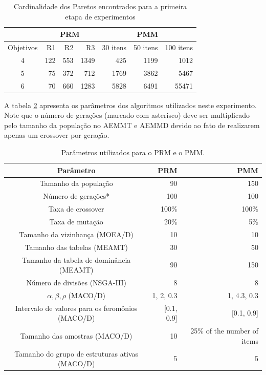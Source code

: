 \begin{table}[!htbp]
	\centering
	\caption{Cardinalidade dos Paretos encontrados para a primeira etapa de experimentos}
	\label{table_exp2_paretos}
	\begin{tabular}{c|rrr|rrr}
		& \multicolumn{3}{c|}{\textbf{PRM}} & \multicolumn{3}{c}{\textbf{PMM}} \\ \hline
		Objetivos & R1         & R2       & R3        & 30 itens  & 50 itens & 100 itens \\ \hline
		4         & 122        & 553       & 1349        & 425       & 1199      & 1012    \\
		5         & 75        & 372      & 712       & 1769      & 3862     & 5467   \\
		6         & 70       & 660      & 1283      & 5828      & 6491   & 55471   \\ \hline
	\end{tabular}
\end{table}

A tabela \ref{table_exp2_parametros} apresenta os parâmetros dos algoritmos utilizados neste experimento. Note que o número de gerações (marcado com asterisco) deve ser multiplicado pelo tamanho da população no AEMMT e AEMMD devido ao fato de realizarem apenas um crossover por geração.

\begin{table}[!htbp]
	\caption{Parâmetros utilizados para o PRM e o PMM.}
	\label{table_exp2_parametros}
	\begin{center}
		\begin{tabular}{c|r|r}
			\textbf{Parâmetro} & \textbf{PRM} &  \textbf{PMM} \\ %
			\hline
			Tamanho da população               &    90 &      150 \\ %
			Número de gerações*        &   100 &      100 \\ %
			Taxa de crossover                & 100\% &    100\% \\ %
			Taxa de mutação                 &  20\% &      5\% \\ %
			Tamanho da vizinhança (MOEA/D)    &    10 &       10 \\ %
			Tamanho das tabelas (MEAMT)   &    30 &       50 \\ %
			Tamanho da tabela de dominância (MEAMT) &    90 &      150 \\ %
			Número de divisões (NSGA-III)&     8 &        8 \\ %
			$\alpha, \beta, \rho$ (MACO/D)& 1, 2, 0.3 & 1, 4.3, 0.3 \\ %
			Intervalo de valores para os feromônios (MACO/D)& [0.1, 0.9] & [0.1, 0.9] \\ %
			Tamanho das amostras (MACO/D)& 10 &25\% of the number of items \\  %
			Tamanho do grupo de estruturas ativas (MACO/D)& 5 & 5 \\
			\hline
		\end{tabular}
	\end{center}
\end{table}


